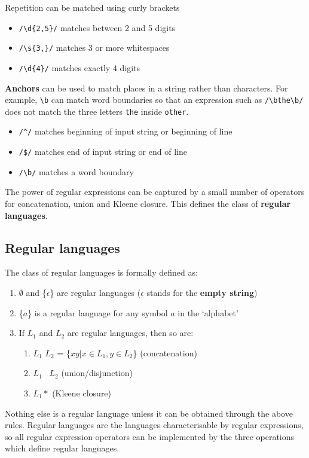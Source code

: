 \documentclass[Report.tex]{subfiles}
\begin{document}
Repetition can be matched using curly brackets
\begin{itemize}
\item \texttt{/\textbackslash d\{2,5\}/} matches between 2 and 5 digits
\item \texttt{/\textbackslash s\{3,\}/} matches 3 or more whitespaces
\item \texttt{/\textbackslash d\{4\}/} matches exactly 4 digits
\end{itemize}
\textbf{Anchors} can be used to match places in a string rather than characters.
For example, \texttt{\textbackslash b} can match word boundaries so that
an expression such as \texttt{/\textbackslash bthe\textbackslash b/} does
not match the three letters \texttt{the} inside \texttt{other}.
\begin{itemize}
\item \texttt{/\^{}/} matches beginning of input string or beginning of line
\item \texttt{/\$/} matches end of input string or end of line
\item \texttt{/\textbackslash b/} matches a word boundary
\end{itemize}
The power of regular expressions can be captured by a small number of operators
for concatenation, union and Kleene closure. This defines the class of 
\textbf{regular languages}.

\subsection{Regular languages}
The class of regular languages is formally defined as:
\begin{enumerate}
\item $\emptyset$ and \{$\epsilon$\} are regular languages ($\epsilon$ stands for
the \textbf{empty string})
\item \{$a$\} is a regular language for any symbol $a$ in the `alphabet'
\item If $L_1$ and $L_2$ are regular languages, then so are:
	\begin{enumerate}
	\item $L_1$ \cdot $L_2$ = \{$xy | x \in L_1, y \in L_2$\} (concatenation)
	\item $L_1$ \cup\ $L_2$ (union/disjunction)
	\item $L_{1}*$ (Kleene closure)
	\end{enumerate}
\end{enumerate}
Nothing else is a regular language unless it can be obtained through the above rules.
Regular languages are the languages characterisable by regular expressions,
so all regular expression operators can be implemented by the three operations
which define regular languages.
\end{document}
